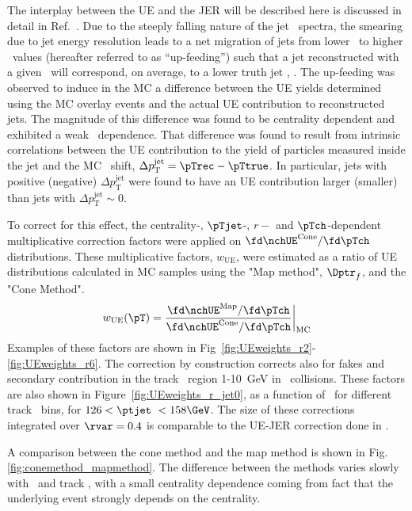 The interplay between the UE and the JER will be described here is discussed in detail in Ref.~\cite{ATLAS-COM-PHYS-2012-1653}. Due to the steeply falling nature of the jet \pt\ spectra, the smearing due to jet energy resolution leads to a net migration of jets from lower \pt\ to higher \pt\ values (hereafter referred to as ``up-feeding'') such that a jet reconstructed with a given \pTrec\ will correspond, on average, to a lower truth jet \pT, \avgpttrue. The up-feeding was observed to induce in the MC a difference between the UE yields determined using the MC overlay events and the actual UE contribution to reconstructed jets. The magnitude of this difference was found to be centrality dependent and exhibited a weak \pTjet\ dependence.
That difference was found to result from intrinsic correlations between the UE contribution to the yield of particles measured inside the jet and the MC \pTjet\ shift, $\Delta p_{\mathrm{T}}^{\mathrm{jet}}= \pTrec - \pTtrue$.  In particular, jets with positive (negative) $\Delta p_{\mathrm{T}}^{\mathrm{jet}}$ were found to have an UE contribution larger (smaller) than jets with $\Delta p_{\mathrm{T}}^{\mathrm{jet}} \sim 0$.  
 
  To correct for this effect, the centrality-, $\pTjet$-, $r-$ and $\pTch$-dependent multiplicative correction factors were applied on $\fd \nchUE^{\mathrm{Cone}}/ \fd \pTch$ distributions. 
  These multiplicative factors, $w_{\mathrm{UE}}$, were estimated as a ratio of UE distributions calculated in MC samples using the "Map method", $\Dptr_{f}$, and the "Cone Method".
  \begin{eqnarray}
  w_{\mathrm{UE}} (\pT) = \frac{\fd \nchUE^{\mathrm{Map}}/ \fd \pTch}{\fd \nchUE^{\mathrm{Cone}}/ \fd \pTch}\bigg|_{\mathrm{MC}}
  \end{eqnarray}   
Examples of these factors are shown in Fig~\ref{fig:UEweights_r2}-\ref{fig:UEweights_r6}. The correction by construction corrects also for fakes and secondary contribution in the track \pT\ region 1-10~GeV in \PbPb\ collisions. These factors are also shown in Figure~\ref{fig:UEweights_r_jet0}, as a function of \rvar\ for different track \pt\ bins, for $126 < \ptjet\ < 158 \GeV$.  The size of these corrections integrated over $\rvar = 0.4$ is comparable to the UE-JER correction done in \cite{PhysRevC.98.024908}.

A comparison between the cone method and the map method is shown in Fig.\ref{fig:conemethod_mapmethod}. The difference between the methods varies slowly with \ptjet\ and track \pT, with a small centrality dependence coming from fact that the underlying event strongly depends on the centrality.

